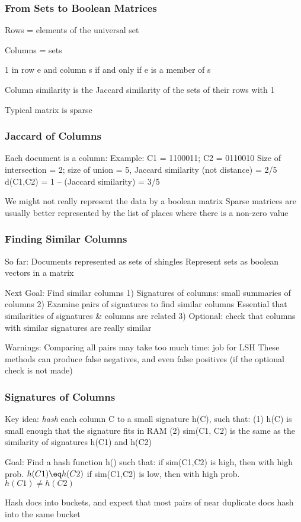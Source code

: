 \documentclass[svgnames]{beamer}
\begin{document}
  
\begin{frame} \frametitle{From Sets to Boolean Matrices}

Rows = elements of the universal set

Columns = sets

1 in row e and column s if and only if e is a member of s

Column similarity is the Jaccard similarity of the sets of their rows with 1

Typical matrix is sparse


\end{frame}

  
\begin{frame} \frametitle{Jaccard of Columns}

Each document is a column:
  Example: C1 = 1100011; C2 = 0110010
  Size of intersection = 2; size of union = 5, Jaccard similarity (not distance) = 2/5
  d(C1,C2) = 1 – (Jaccard similarity) = 3/5

We might not really represent the data by a boolean matrix
  Sparse matrices are usually better represented by the list of places where there is a non-zero value
  

\end{frame}

  
\begin{frame} \frametitle{Finding Similar Columns}

So far:
  Documents represented as sets of shingles
  Represent sets as boolean vectors in a matrix

Next Goal: Find similar columns
 1) Signatures of columns: small summaries of columns
 2) Examine pairs of signatures to find similar columns 
       Essential that similarities of signatures & columns are related
 3) Optional: check that columns with similar signatures are really similar

Warnings:
  Comparing all pairs may take too much time: job for LSH
  These methods can produce false negatives, and even false positives (if the optional check is not made)
  
\end{frame}

  
\begin{frame} \frametitle{Signatures of Columns}

Key idea: \emph{hash} each column C to a small signature h(C), such that:
  (1) h(C) is small enough that the signature fits in RAM
  (2) sim(C1, C2) is the same as the similarity of signatures h(C1) and h(C2)

Goal: Find a hash function h() such that:
  if sim(C1,C2) is high, then with high prob. $h(C1) \eq h(C2)$
  if sim(C1,C2) is low, then with high prob. $h(C1) \neq h(C2)$

Hash docs into buckets, and expect that most pairs of near duplicate docs hash into the same bucket

\end{frame}
\end{document}
